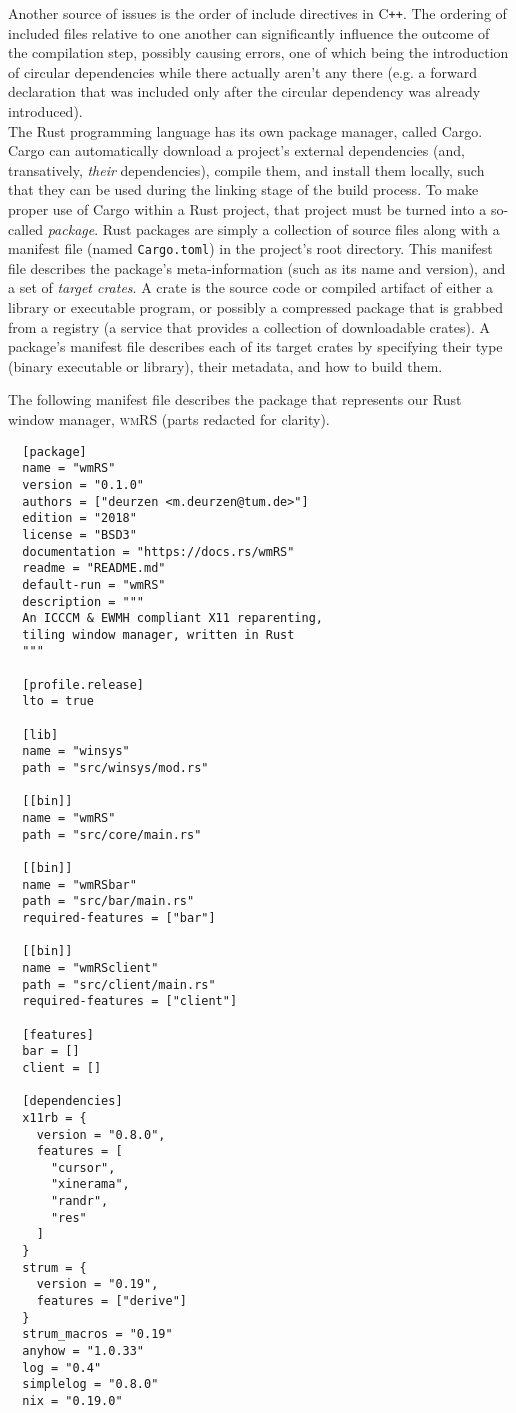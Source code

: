 Another source of issues is the order of include directives in C\texttt{++}. The
ordering of included  files relative to one another  can significantly influence
the outcome of the compilation step, possibly causing errors, one of which being
the introduction of circular dependencies  while there actually aren't any there
(e.g. a forward declaration that was included only after the circular dependency
was already introduced).\\

The Rust programming  language has its own package manager,  called Cargo. Cargo
can automatically download a project's external dependencies (and, transatively,
\textit{their} dependencies), compile them, and  install them locally, such that
they can be used  during the linking stage of the build  process. To make proper
use of Cargo within a Rust project, that project must be turned into a so-called
\textit{package}.  Rust  packages  are  simply  a  collection  of  source  files
along with  a manifest  file (named \texttt{Cargo.toml})  in the  project's root
directory. This manifest file describes  the package's meta-information (such as
its name  and version),  and a  set of  \textit{target crates}.  A crate  is the
source code or  compiled artifact of either a library  or executable program, or
possibly a  compressed package that is  grabbed from a registry  (a service that
provides  a  collection  of  downloadable crates).  A  package's  manifest  file
describes each of its target crates  by specifying their type (binary executable
or library), their metadata, and how to build them.

The  following manifest  file describes  the  package that  represents our  Rust
window manager, \textsc{wmRS} (parts redacted for clarity).\\

\begin{verbatim}
  [package]
  name = "wmRS"
  version = "0.1.0"
  authors = ["deurzen <m.deurzen@tum.de>"]
  edition = "2018"
  license = "BSD3"
  documentation = "https://docs.rs/wmRS"
  readme = "README.md"
  default-run = "wmRS"
  description = """
  An ICCCM & EWMH compliant X11 reparenting,
  tiling window manager, written in Rust
  """
  
  [profile.release]
  lto = true
  
  [lib]
  name = "winsys"
  path = "src/winsys/mod.rs"
  
  [[bin]]
  name = "wmRS"
  path = "src/core/main.rs"
  
  [[bin]]
  name = "wmRSbar"
  path = "src/bar/main.rs"
  required-features = ["bar"]
  
  [[bin]]
  name = "wmRSclient"
  path = "src/client/main.rs"
  required-features = ["client"]
  
  [features]
  bar = []
  client = []
  
  [dependencies]
  x11rb = {
    version = "0.8.0",
    features = [
      "cursor",
      "xinerama",
      "randr",
      "res"
    ]
  }
  strum = {
    version = "0.19",
    features = ["derive"]
  }
  strum_macros = "0.19"
  anyhow = "1.0.33"
  log = "0.4"
  simplelog = "0.8.0"
  nix = "0.19.0"
\end{verbatim}

